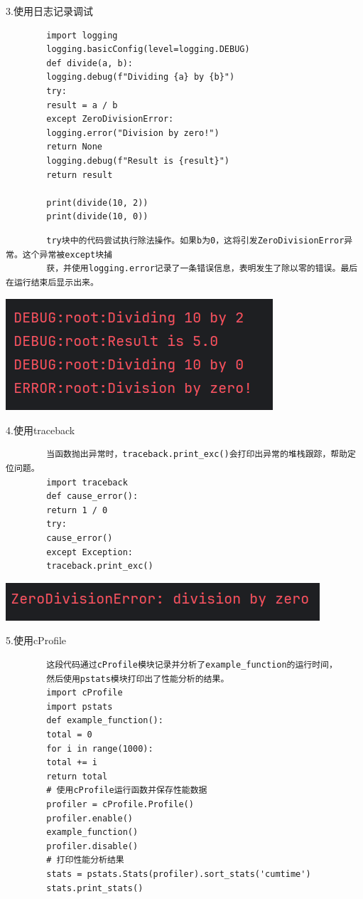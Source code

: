 \documentclass{article}
\begin{document}
	3.使用日志记录调试
	\begin{verbatim}
		import logging
		logging.basicConfig(level=logging.DEBUG)
		def divide(a, b):
		logging.debug(f"Dividing {a} by {b}")
		try:
		result = a / b
		except ZeroDivisionError:
		logging.error("Division by zero!")
		return None
		logging.debug(f"Result is {result}")
		return result
		
		print(divide(10, 2))
		print(divide(10, 0))
	\end{verbatim}
	
	\begin{verbatim}
		try块中的代码尝试执行除法操作。如果b为0，这将引发ZeroDivisionError异常。这个异常被except块捕
		获，并使用logging.error记录了一条错误信息，表明发生了除以零的错误。最后在运行结束后显示出来。
	\end{verbatim}
	
	\noindent
	\begin{minipage}{\linewidth}
		\centering
		\includegraphics[width=0.5\linewidth]{example15.png}
		\label{fig:example}
	\end{minipage}
	
	4.使用traceback
	\begin{verbatim}
		当函数抛出异常时，traceback.print_exc()会打印出异常的堆栈跟踪，帮助定位问题。
		import traceback
		def cause_error():
		return 1 / 0
		try:
		cause_error()
		except Exception:
		traceback.print_exc()
	\end{verbatim}
	
	\noindent
	\begin{minipage}{\linewidth}
		\centering
		\includegraphics[width=0.5\linewidth]{example16.png}
		\label{fig:example}
	\end{minipage}
	
	5.使用cProfile
	\begin{verbatim}
		这段代码通过cProfile模块记录并分析了example_function的运行时间，
		然后使用pstats模块打印出了性能分析的结果。
		import cProfile
		import pstats
		def example_function():
		total = 0
		for i in range(1000):
		total += i
		return total
		# 使用cProfile运行函数并保存性能数据
		profiler = cProfile.Profile()
		profiler.enable()
		example_function()
		profiler.disable()
		# 打印性能分析结果
		stats = pstats.Stats(profiler).sort_stats('cumtime')
		stats.print_stats()     
	\end{verbatim}
	
\end{document}
